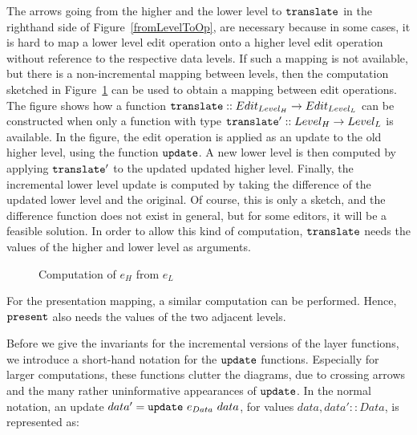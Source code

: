 The arrows going from the higher and the lower level to ${\tt translate}$ in the righthand side of Figure~\ref{fromLevelToOp}, are necessary because in some cases, it is hard to map a lower level edit operation onto a higher level edit operation without reference to the respective data levels. If such a mapping is not available, but there is a non-incremental mapping between levels, then the computation sketched in Figure~\ref{computeOps} can be used to obtain a mapping between edit operations. The figure shows how a function ${\tt translate} :: Edit_{Level_{H}} \rightarrow Edit_{Level_{L}}$ can be constructed when only a function with type ${\tt translate'} :: Level_{H} \rightarrow Level_{L}$  is available. In the figure, the edit operation is applied as an update to the old higher level, using the function ${\tt update}$. A new lower level is then computed by applying ${\tt translate'}$ to the updated updated higher level. Finally, the incremental lower level update is computed by taking the difference of the updated lower level and the original. Of course, this is only a sketch, and the difference function does not exist in general, but for some editors, it will be a feasible solution. In order to allow this kind of computation, ${\tt translate}$ needs the values of the higher and lower level as arguments.

\begin{figure}
\begin{small}
\begin{center}
\begin{center}
\end{center}\caption{Computation of $e_{H}$ from $e_{L}$}\label{computeOps} 
\end{center}
\end{small}
\end{figure}

For the presentation mapping, a similar computation can be performed. Hence, ${\tt present}$ also needs the values of the two adjacent levels. 

Before we give the invariants for the incremental versions of the layer functions, we introduce a short-hand notation for the ${\tt update}$ functions. Especially for larger computations, these functions clutter the diagrams, due to crossing arrows and the many rather uninformative appearances of ${\tt update}$. In the normal notation, an update $data' = {\tt update}~e_{Data}~data$, for values 
$data, data' :: Data$, is represented as:\\

